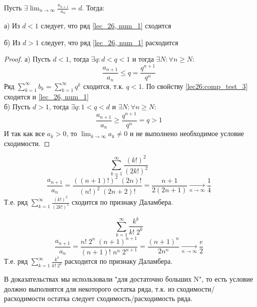 \documentclass[../../main.tex]{subfiles}
\begin{document}
	\begin{thm}\label{lec27:dalamber}
		
		Пусть $\exists \lim_{n \to \infty } \frac{a_{n+1}}{a_n} = d$. Тогда:
		
		а) Из $d < 1$ следует, что ряд \ref{lec_26, num_1} сходится
		
		б) Из $d > 1$ следует, что ряд \ref{lec_26, num_1} расходится
		
		\begin{proof}
			
			а) Пусть $d < 1$, тогда $\exists q : d < q < 1$  и тогда $\exists N : \forall n \geq N$:			
			\[ \frac{a_{n+1}}{a_n} \leq q = \frac{q^{n+1}}{q^n}   \]
			Ряд $\sum_{k=1}^{\infty} b_k = \sum_{k=1}^{\infty} q^k$ сходится, т.к. $q<1$. По свойству \ref{lec26:comp_test_3} сходится и \ref{lec_26, num_1} \\
			б) Пусть $d > 1$, тогда $\exists q : 1 < q < d $ и $\exists N : \forall n \geq N$:
			\[  \frac{a_{n+1}}{a_n} \geq \frac{q^{n+1}}{q^n} = q > 1    \]
			И так как все $a_k > 0$, то $\lim_{k \to \infty} a_k \neq 0 $ и не выполнено необходимое условие сходимости.
		\end{proof}
	\end{thm}			
	
	\begin{example}
		\[ \sum_{k = 1}^{\infty} \frac{(k!)^2}{(2k!)^2}    \]
		\[ \frac{a_{n+1}}{a_n} = \frac{((n+1)!)^2 \; (2n)!}{(n!)^2 \; (2n+2)!} = \frac{n+1}{2(2n+1)}  \underset{n \rightarrow \infty} {\longrightarrow} \frac{1}{4}    \]
		Т.е. ряд $\sum_{k = 1}^{\infty} \frac{(k!)^2}{(2k!)^2}$ сходится по признаку Даламбера.
		
	\end{example}

	\begin{example}
		\[  \sum_{k = 1}^{\infty} \frac{k^k}{k! \; 2^k} \]
		\[ \frac{a_{n+1}}{a_n} = \frac{n! \; 2^n \; (n+1)^{n+1}}{(n+1)! \; n^n \; 2^{n+1}} = \frac{(n+1)^{n}}{2 n^n } \underset{n \rightarrow \infty} {\longrightarrow}  \frac{e}{2} \]
		Т.е. ряд $\sum_{k = 1}^{\infty} \frac{k^k}{k! \; 2^k}$ расходится по признаку Даламбера.
	\end{example}	

	\begin{remark} В доказательствах мы использовали "для достаточно больших N", то есть условие должно выполнятся для некоторого остатка ряда, т.к. из сходимости/расходимости остатка следует сходимость/расходимость ряда.
		
	\end{remark}	
\end{document}
